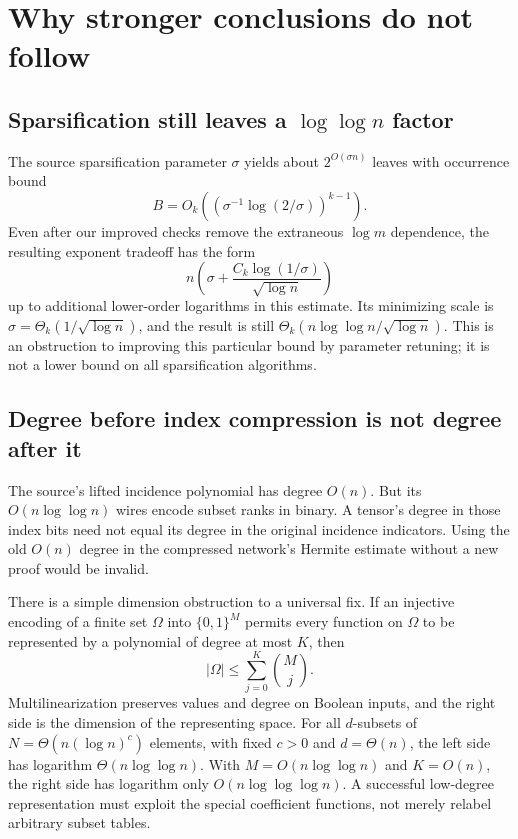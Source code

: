 \documentclass[11pt]{article}
\theoremstyle{remark}
\begin{document}
\section{Why stronger conclusions do not follow}\label{sec:limits}
\subsection{\texorpdfstring{Sparsification still leaves a \(\log\log n\) factor}{Sparsification still leaves a log log n factor}}
The source sparsification parameter \(\sigma\) yields about
\(2^{O(\sigma n)}\) leaves with occurrence bound
\[
 B=O_k\!\left((\sigma^{-1}\log(2/\sigma))^{k-1}\right).
\]
Even after our improved checks remove the extraneous \(\log m\)
dependence, the resulting exponent tradeoff has the form
\[
 n\left(\sigma+
 \frac{C_k\log(1/\sigma)}{\sqrt{\log n}}\right)
\]
up to additional lower-order logarithms in this estimate.
Its minimizing scale is
\(\sigma=\Theta_k(1/\sqrt{\log n})\), and the result is still
\(\Theta_k(n\log\log n/\sqrt{\log n})\).
This is an obstruction to improving this particular bound by parameter
retuning; it is not a lower bound on all sparsification algorithms.

\subsection{Degree before index compression is not degree after it}
The source's lifted incidence polynomial has degree \(O(n)\).
But its \(O(n\log\log n)\) wires encode subset ranks in binary.
A tensor's degree in those index bits need not equal its degree
in the original incidence indicators.
Using the old \(O(n)\) degree in the compressed network's Hermite
estimate without a new proof would be invalid.

There is a simple dimension obstruction to a universal fix.
If an injective encoding of a finite set \(\Omega\) into
\(\{0,1\}^M\) permits every function on \(\Omega\) to be represented
by a polynomial of degree at most \(K\), then
\[
 |\Omega|\le\sum_{j=0}^{K}\binom Mj.
\]
Multilinearization preserves values and degree on Boolean inputs,
and the right side is the dimension of the representing space.
For all \(d\)-subsets of \(N=\Theta(n(\log n)^c)\) elements, with
fixed \(c>0\) and \(d=\Theta(n)\), the left side has logarithm
\(\Theta(n\log\log n)\).
With \(M=O(n\log\log n)\) and \(K=O(n)\), the right side has
logarithm only \(O(n\log\log\log n)\).
A successful low-degree representation must exploit the special
coefficient functions, not merely relabel arbitrary subset tables.
\end{document}
